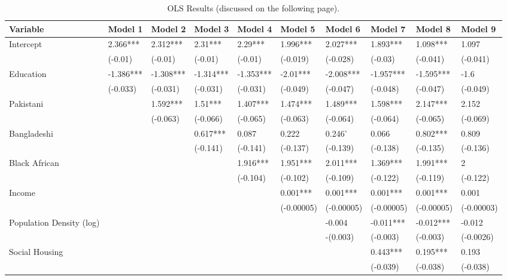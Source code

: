 \documentclass[12pt,twoside]{reedthesis}
\begin{document}
\begin{landscape}\begingroup\fontsize{8}{10}\selectfont
\begin{longtabu} to 
\caption{\label{tab:table3}OLS Results (discussed on the following page).}\\
\toprule
Variable & Model 1 & Model 2 & Model 3 & Model 4 & Model 5 & Model 6 & Model 7 & Model 8 & Model 9\\
\midrule
Intercept & 2.366*** & 2.312*** & 2.31*** & 2.29*** & 1.996*** & 2.027*** & 1.893*** & 1.098*** & 1.097\\
 & (-0.01) & (-0.01) & (-0.01) & (-0.01) & (-0.019) & (-0.028) & (-0.03) & (-0.041) & (-0.041)\\
Education & -1.386*** & -1.308*** & -1.314*** & -1.353*** & -2.01*** & -2.008*** & -1.957*** & -1.595*** & -1.6\\
 & (-0.033) & (-0.031) & (-0.031) & (-0.031) & (-0.049) & (-0.047) & (-0.048) & (-0.047) & (-0.049)\\
Pakistani &  & 1.592*** & 1.51*** & 1.407*** & 1.474*** & 1.489*** & 1.598*** & 2.147*** & 2.152\\
\addlinespace
 &  & (-0.063) & (-0.066) & (-0.065) & (-0.063) & (-0.064) & (-0.064) & (-0.065) & (-0.069)\\
Bangladeshi &  &  & 0.617*** & 0.087 & 0.222 & 0.246' & 0.066 & 0.802*** & 0.809\\
 &  &  & (-0.141) & (-0.141) & (-0.137) & (-0.139) & (-0.138) & (-0.135) & (-0.136)\\
Black African &  &  &  & 1.916*** & 1.951*** & 2.011*** & 1.369*** & 1.991*** & 2\\
 &  &  &  & (-0.104) & (-0.102) & (-0.109) & (-0.122) & (-0.119) & (-0.122)\\
\addlinespace
Income &  &  &  &  & 0.001*** & 0.001*** & 0.001*** & 0.001*** & 0.001\\
 &  &  &  &  & (-0.00005) & (-0.00005) & (-0.00005) & (-0.00005) & (-0.00003)\\
Population Density (log) &  &  &  &  &  & -0.004 & -0.011*** & -0.012*** & -0.012\\
 &  &  &  &  &  & -(0.003) & (-0.003) & (-0.003) & (-0.0026)\\
Social Housing &  &  &  &  &  &  & 0.443*** & 0.195*** & 0.193\\
\addlinespace
 &  &  &  &  &  &  & (-0.039) & (-0.038) & (-0.038)\\

\end{longtabu}
\end{landscape}
\end{document}
